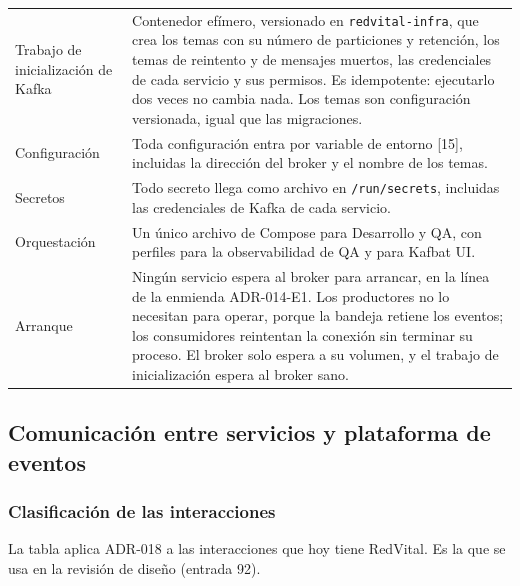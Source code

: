 \documentclass[11pt,a4paper]{article}
\begin{document}
\begin{longtable}{L{3.9cm} L{10.7cm}}
Trabajo de inicialización de Kafka & Contenedor efímero, versionado en \texttt{redvital-infra}, que crea los temas con su número de particiones y retención, los temas de reintento y de mensajes muertos, las credenciales de cada servicio y sus permisos. Es idempotente: ejecutarlo dos veces no cambia nada. Los temas son configuración versionada, igual que las migraciones. \\
Configuración & Toda configuración entra por variable de entorno {[}15{]}, incluidas la dirección del broker y el nombre de los temas. \\
Secretos & Todo secreto llega como archivo en \texttt{/run/secrets}, incluidas las credenciales de Kafka de cada servicio. \\
Orquestación & Un único archivo de Compose para Desarrollo y QA, con perfiles para la observabilidad de QA y para Kafbat UI. \\
Arranque & Ningún servicio espera al broker para arrancar, en la línea de la enmienda ADR-014-E1. Los productores no lo necesitan para operar, porque la bandeja retiene los eventos; los consumidores reintentan la conexión sin terminar su proceso. El broker solo espera a su volumen, y el trabajo de inicialización espera al broker sano. \\
\end{longtable}

\subsection{Comunicación entre servicios y plataforma de eventos}
\label{sec:eventos}

\subsubsection*{Clasificación de las interacciones}

La tabla aplica ADR-018 a las interacciones que hoy tiene RedVital. Es la que se usa en la revisión de diseño (entrada 92).
\end{document}
